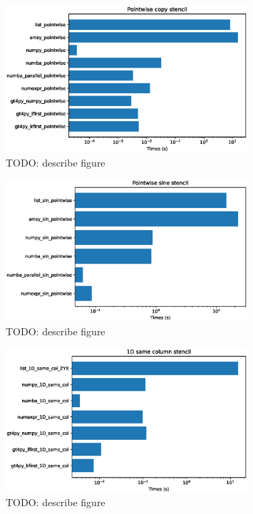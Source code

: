 \documentclass[12pt]{article}
\begin{document}
\begin{figure}[H]
    \centering
    \includegraphics[width=0.8\textwidth]{pointwise_copy_stencil.eps}
    \caption{{\color{red}TODO: describe figure}}
    \label{fig:stencil_copy}
\end{figure}

\begin{figure}[H]
    \centering
    \includegraphics[width=0.8\textwidth]{pointwise_sine_stencil.eps}
    \caption{{\color{red}TODO: describe figure}}
    \label{fig:stencil_sine}
\end{figure}

\begin{figure}[H]
    \centering
    \includegraphics[width=0.8\textwidth]{1d_same_column_stencil.eps}
    \caption{{\color{red}TODO: describe figure}}
    \label{fig:stencil_1D}
\end{figure}
\end{document}
